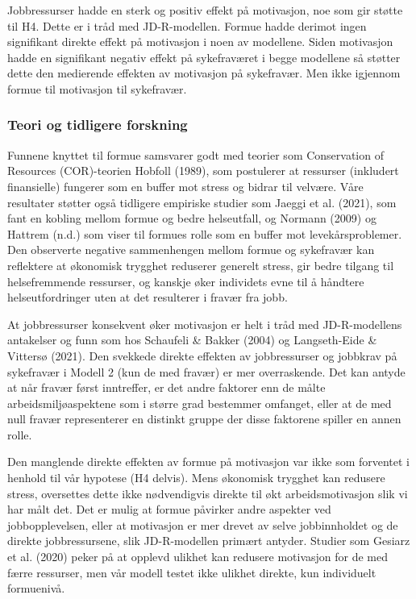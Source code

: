 \documentclass[
  12pt,
  a4paper,
  DIV=11,
  numbers=noendperiod]{scrartcl}
\begin{document}
Jobbressurser hadde en sterk og positiv effekt på motivasjon, noe som
gir støtte til H4. Dette er i tråd med JD-R-modellen. Formue hadde
derimot ingen signifikant direkte effekt på motivasjon i noen av
modellene. Siden motivasjon hadde en signifikant negativ effekt på
sykefraværet i begge modellene så støtter dette den medierende effekten
av motivasjon på sykefravær. Men ikke igjennom formue til motivasjon til
sykefravær.

\subsubsection{Teori og tidligere
forskning}\label{teori-og-tidligere-forskning}

Funnene knyttet til formue samsvarer godt med teorier som Conservation
of Resources (COR)-teorien Hobfoll (1989), som postulerer at ressurser
(inkludert finansielle) fungerer som en buffer mot stress og bidrar til
velvære. Våre resultater støtter også tidligere empiriske studier som
Jaeggi et al. (2021), som fant en kobling mellom formue og bedre
helseutfall, og Normann (2009) og Hattrem (n.d.) som viser til formues
rolle som en buffer mot levekårsproblemer. Den observerte negative
sammenhengen mellom formue og sykefravær kan reflektere at økonomisk
trygghet reduserer generelt stress, gir bedre tilgang til helsefremmende
ressurser, og kanskje øker individets evne til å håndtere
helseutfordringer uten at det resulterer i fravær fra jobb.

At jobbressurser konsekvent øker motivasjon er helt i tråd med
JD-R-modellens antakelser og funn som hos Schaufeli \& Bakker (2004) og
Langseth-Eide \& Vittersø (2021). Den svekkede direkte effekten av
jobbressurser og jobbkrav på sykefravær i Modell 2 (kun de med fravær)
er mer overraskende. Det kan antyde at når fravær først inntreffer, er
det andre faktorer enn de målte arbeidsmiljøaspektene som i større grad
bestemmer omfanget, eller at de med null fravær representerer en
distinkt gruppe der disse faktorene spiller en annen rolle.

Den manglende direkte effekten av formue på motivasjon var ikke som
forventet i henhold til vår hypotese (H4 delvis). Mens økonomisk
trygghet kan redusere stress, oversettes dette ikke nødvendigvis direkte
til økt arbeidsmotivasjon slik vi har målt det. Det er mulig at formue
påvirker andre aspekter ved jobbopplevelsen, eller at motivasjon er mer
drevet av selve jobbinnholdet og de direkte jobbressursene, slik
JD-R-modellen primært antyder. Studier som Gesiarz et al. (2020) peker
på at opplevd ulikhet kan redusere motivasjon for de med færre
ressurser, men vår modell testet ikke ulikhet direkte, kun individuelt
formuenivå.
\end{document}
